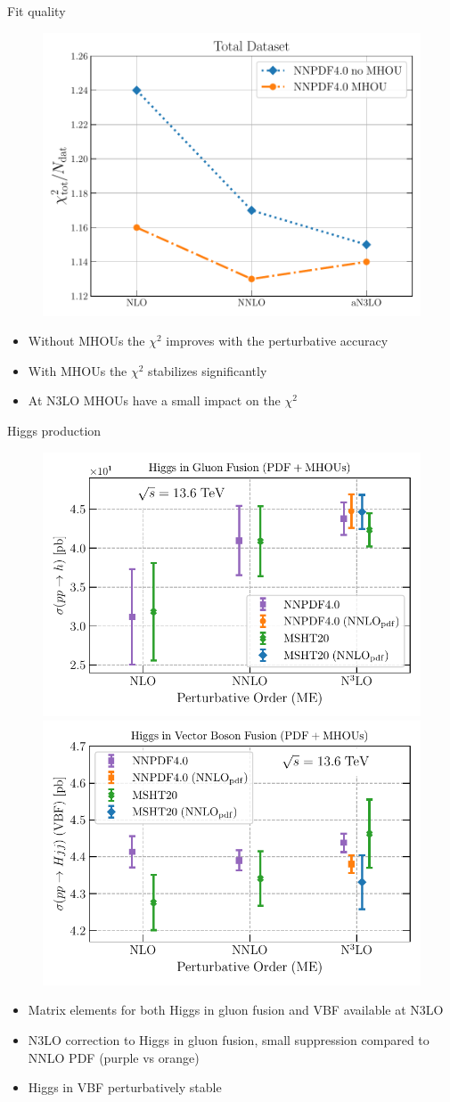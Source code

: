 \documentclass[8pt,t]{beamer}
\begin{document}
\begin{frame}{Fit quality}
  \begin{figure}[!t]
    \includegraphics[width=.4\textwidth]{figures/chi2_n3lo_summary.pdf}
  \end{figure}
  \begin{itemize}
    \item Without MHOUs the $\chi^2$ improves with the perturbative accuracy
    \item With MHOUs the $\chi^2$ stabilizes significantly
    \item At N3LO MHOUs have a small impact on the $\chi^2$
  \end{itemize}
\end{frame}

\begin{frame}{Higgs production}
  \begin{figure}[!t]
    \centering
    \includegraphics[width=0.49\linewidth]{figures/higgs-ggF-n3lo.pdf}
    \includegraphics[width=0.49\linewidth]{figures/H_VBF-n3lo.pdf}
  \end{figure}
  \begin{itemize}
    \item Matrix elements for both Higgs in gluon fusion and VBF available at N3LO
    \item N3LO correction to Higgs in gluon fusion, small suppression compared to NNLO PDF (purple vs orange)
    \item Higgs in VBF perturbatively stable
  \end{itemize}
\end{frame}
\end{document}
